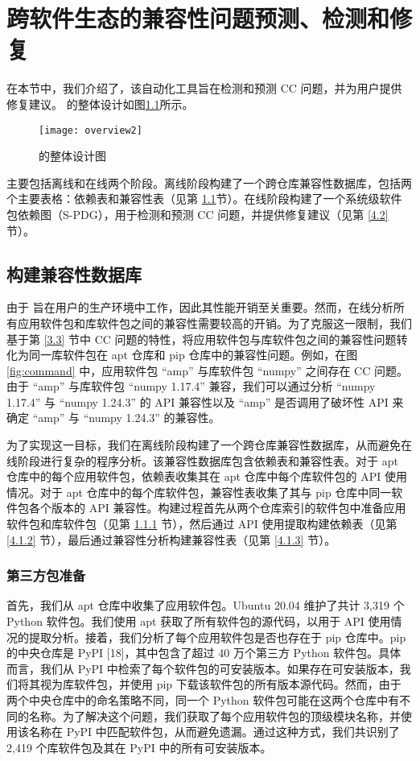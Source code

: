 \chapter{跨软件生态的兼容性问题预测、检测和修复}
在本节中，我们介绍了\tool{}，该自动化工具旨在检测和预测 CC 问题，并为用户提供修复建议。
\tool{}的整体设计如图\ref{fig:overview}所示。
\begin{figure}[htbp] %
	\centering
	\texttt{[image: overview2]}
	\caption{\tool{}的整体设计图}
	\label{fig:overview}
\end{figure}
\tool{}主要包括离线和在线两个阶段。离线阶段构建了一个跨仓库兼容性数据库，包括两个主要表格：依赖表和兼容性表（见第 \ref{4.1}节）。在线阶段构建了一个系统级软件包依赖图（S-PDG），用于检测和预测 CC 问题，并提供修复建议（见第 \ref{4.2} 节）。

\section{构建兼容性数据库}\label{4.1}
由于 \tool{} 旨在用户的生产环境中工作，因此其性能开销至关重要。然而，在线分析所有应用软件包和库软件包之间的兼容性需要较高的开销。为了克服这一限制，我们基于第 \ref{3.3} 节中 CC 问题的特性，将应用软件包与库软件包之间的兼容性问题转化为同一库软件包在 apt 仓库和 pip 仓库中的兼容性问题。例如，在图 \ref{fig:command} 中，应用软件包 “amp” 与库软件包 “numpy” 之间存在 CC 问题。由于 “amp” 与库软件包 “numpy 1.17.4” 兼容，我们可以通过分析 “numpy 1.17.4” 与 “numpy 1.24.3” 的 API 兼容性以及 “amp” 是否调用了破坏性 API 来确定 “amp” 与 “numpy 1.24.3” 的兼容性。

为了实现这一目标，我们在离线阶段构建了一个跨仓库兼容性数据库，从而避免在线阶段进行复杂的程序分析。该兼容性数据库包含依赖表和兼容性表。对于 apt 仓库中的每个应用软件包，依赖表收集其在 apt 仓库中每个库软件包的 API 使用情况。对于 apt 仓库中的每个库软件包，兼容性表收集了其与 pip 仓库中同一软件包各个版本的 API 兼容性。构建过程首先从两个仓库索引的软件包中准备应用软件包和库软件包（见第 \ref{4.1.1} 节），然后通过 API 使用提取构建依赖表（见第 \ref{4.1.2} 节），最后通过兼容性分析构建兼容性表（见第 \ref{4.1.3} 节）。

\subsection{第三方包准备}\label{4.1.1}
首先，我们从 apt 仓库中收集了应用软件包。Ubuntu 20.04 维护了共计 3,319 个 Python 软件包。我们使用 apt 获取了所有软件包的源代码，以用于 API 使用情况的提取分析。接着，我们分析了每个应用软件包是否也存在于 pip 仓库中。pip 的中央仓库是 PyPI [18]，其中包含了超过 40 万个第三方 Python 软件包。具体而言，我们从 PyPI 中检索了每个软件包的可安装版本。如果存在可安装版本，我们将其视为库软件包，并使用 pip 下载该软件包的所有版本源代码。然而，由于两个中央仓库中的命名策略不同，同一个 Python 软件包可能在这两个仓库中有不同的名称。为了解决这个问题，我们获取了每个应用软件包的顶级模块名称，并使用该名称在 PyPI 中匹配软件包，从而避免遗漏。通过这种方式，我们共识别了 2,419 个库软件包及其在 PyPI 中的所有可安装版本。

